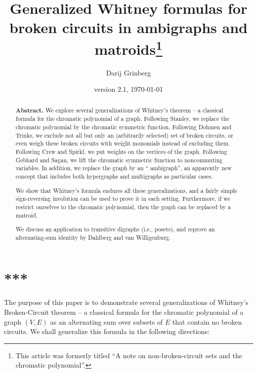 \documentclass[numbers=enddot,12pt,final,onecolumn,notitlepage]{scrartcl}%
\theoremstyle{definition}
\begin{document}
\title{Generalized Whitney formulas for broken circuits in ambigraphs and
matroids\thanks{This article was formerly titled \textquotedblleft A note on
non-broken-circuit sets and the chromatic polynomial\textquotedblright.}}
\author{Darij Grinberg}
\date{version 2.1, \today}
\maketitle

\begin{abstract}
\textbf{Abstract.} We explore several generalizations of Whitney's theorem --
a classical formula for the chromatic polynomial of a graph. Following
Stanley, we replace the chromatic polynomial by the chromatic symmetric
function. Following Dohmen and Trinks, we exclude not all but only an
(arbitrarily selected) set of broken circuits, or even weigh these broken
circuits with weight monomials instead of excluding them. Following Crew and
Spirkl, we put weights on the vertices of the graph. Following Gebhard and
Sagan, we lift the chromatic symmetric function to noncommuting variables. In
addition, we replace the graph by an \textquotedblleft
ambigraph\textquotedblright, an apparently new concept that includes both
hypergraphs and multigraphs as particular cases.

We show that Whitney's formula endures all these generalizations, and a fairly
simple sign-reversing involution can be used to prove it in each setting.
Furthermore, if we restrict ourselves to the chromatic polynomial, then the
graph can be replaced by a matroid.

We discuss an application to transitive digraphs (i.e., posets), and reprove
an alternating-sum identity by Dahlberg and van Willigenburg.

\end{abstract}
\tableofcontents

\section*{***}

The purpose of this paper is to demonstrate several generalizations of
Whitney's Broken-Circuit theorem \cite[\S 7]{Whitne32} -- a classical formula
for the chromatic polynomial of a graph $\left(  V,E\right)  $ as an
alternating sum over subsets of $E$ that contain no broken circuits. We shall
generalize this formula in the following directions:
\end{document}
